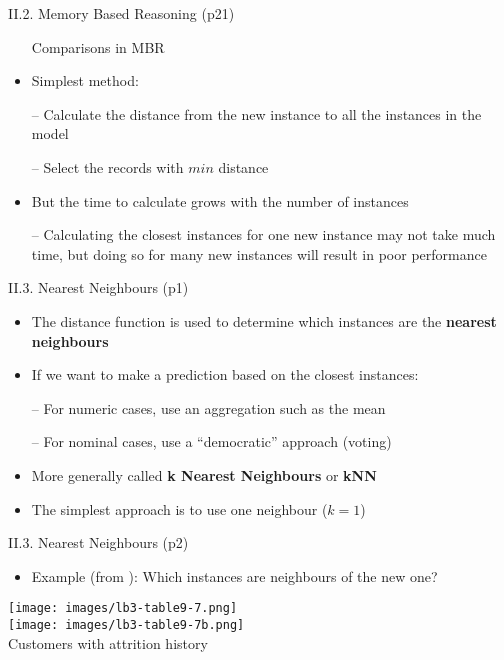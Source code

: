 \documentclass[handout]{beamer}
\newcommand{\stronger}[1]{\textbf{\color{purple} #1}}
\begin{document}
\begin{frame}{II.2. Memory Based Reasoning (p21)}
\begin{itemize}
\item[] Comparisons in MBR
\item[]
\item Simplest method:
\item[--] Calculate the distance from the new instance to all the instances in the model
\item[--] Select the records with $min$ distance
\item[]
\item But the time to calculate grows with the number of instances
\item[--] Calculating the closest instances for one new instance may not take much time, but doing so for many new instances will result in poor performance
\end{itemize}
\end{frame}
\begin{frame}{II.3. Nearest Neighbours (p1)}
\begin{itemize}
\item The distance function is used to determine which instances are the \stronger{nearest neighbours}
\item If we want to make a prediction based on the closest instances:
\item[--] For numeric cases, use an aggregation such as the mean
\item[--] For nominal cases, use a ``democratic'' approach (voting)
\item[]
\item More generally called \stronger{k Nearest Neighbours} or \stronger{kNN}
\item The simplest approach is to use one neighbour ($k=1$)
\end{itemize}
\end{frame}
\begin{frame}{II.3. Nearest Neighbours (p2)}
\begin{itemize}
\item Example (from \cite[ch.9]{LB3:2011}): Which instances are neighbours of the new one?
\end{itemize}
\begin{center}
\texttt{[image: images/lb3-table9-7.png]} \\
\texttt{[image: images/lb3-table9-7b.png]} \\
Customers with attrition history~
\cite[Table 9.7]{LB3:2011}
\end{center}
\end{frame}
\end{document}
